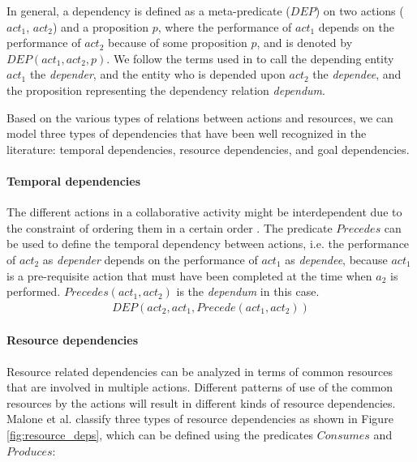 In general, a dependency is defined as a meta-predicate ($DEP$) on two actions ($act_1$, $act_2$) and a proposition $p$, where the performance of $act_1$ depends on the performance of $act_2$ because of some proposition $p$, and is denoted by $DEP(act_1, act_2, p)$. We follow the terms used in \cite{yu1993actor} to call the depending entity $act_1$ the \emph{depender}, and the entity who is depended upon $act_2$ the \emph{dependee}, and the proposition representing the dependency relation \emph{dependum}.

Based on the various types of relations between actions and resources, we can model three types of dependencies that have been well recognized in the literature: temporal dependencies, resource dependencies, and goal  dependencies.

\paragraph*{Temporal dependencies} %
\label{par:temporal_dependencies}
The different actions in a collaborative activity might be interdependent due to the constraint of ordering them in a certain order \cite{sikora1998a}. The predicate $Precedes$ can be used to define the temporal dependency between actions, i.e. the performance of $act_2$ as \emph{depender} depends on the performance of $act_1$ as \emph{dependee}, because $act_1$ is a pre-requisite action that must have been completed at the time when $a_2$ is performed. $Precedes(act_1, act_2)$ is the \emph{dependum} in this case.
\begin{align*} 
	 DEP(act_2, act_1, Precede(act_1, act_2))
\end{align*}

\paragraph*{Resource dependencies} %
\label{par:resource_dependencies}
Resource related dependencies can be analyzed in terms of common resources that are involved in multiple actions. Different patterns of use of the common resources by the actions will result in different kinds of resource dependencies. Malone et al. \cite{malone1994interdisciplinary} classify three types of resource dependencies as shown in Figure \ref{fig:resource_deps}, which can be defined using the predicates $Consumes$ and $Produces$:

